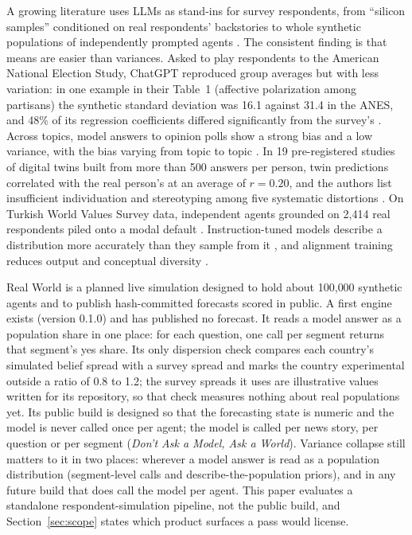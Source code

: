 \documentclass[11pt]{article}
\begin{document}
A growing literature uses LLMs as stand-ins for survey respondents, from ``silicon samples'' conditioned on real respondents' backstories \citep{argyle2023outofone} to whole synthetic populations of independently prompted agents \citep{ozkan2026distribution}. The consistent finding is that means are easier than variances. Asked to play respondents to the American National Election Study, ChatGPT reproduced group averages but with less variation: in one example in their Table~1 (affective polarization among partisans) the synthetic standard deviation was 16.1 against 31.4 in the ANES, and 48\% of its regression coefficients differed significantly from the survey's \citep{bisbee2024synthetic}. Across topics, model answers to opinion polls show a strong bias and a low variance, with the bias varying from topic to topic \citep{boelaert2025machine}. In 19 pre-registered studies of digital twins built from more than 500 answers per person, twin predictions correlated with the real person's at an average of $r=0.20$, and the authors list insufficient individuation and stereotyping among five systematic distortions \citep{peng2025funhouse}. On Turkish World Values Survey data, independent agents grounded on 2{,}414 real respondents piled onto a modal default \citep{ozkan2026distribution}. Instruction-tuned models describe a distribution more accurately than they sample from it \citep{meister2025benchmarking,jang2026cannot}, and alignment training reduces output and conceptual diversity \citep{kirk2023rlhf,murthy2025onefish}.

Real World is a planned live simulation designed to hold about 100{,}000 synthetic agents and to publish hash-committed forecasts scored in public. A first engine exists (version 0.1.0) and has published no forecast. It reads a model answer as a population share in one place: for each question, one call per segment returns that segment's yes share. Its only dispersion check compares each country's simulated belief spread with a survey spread and marks the country experimental outside a ratio of 0.8 to 1.2; the survey spreads it uses are illustrative values written for its repository, so that check measures nothing about real populations yet. Its public build is designed so that the forecasting state is numeric and the model is never called once per agent; the model is called per news story, per question or per segment (\emph{Don't Ask a Model, Ask a World}). Variance collapse still matters to it in two places: wherever a model answer is read as a population distribution (segment-level calls and describe-the-population priors), and in any future build that does call the model per agent. This paper evaluates a standalone respondent-simulation pipeline, not the public build, and Section~\ref{sec:scope} states which product surfaces a pass would license.
\end{document}
